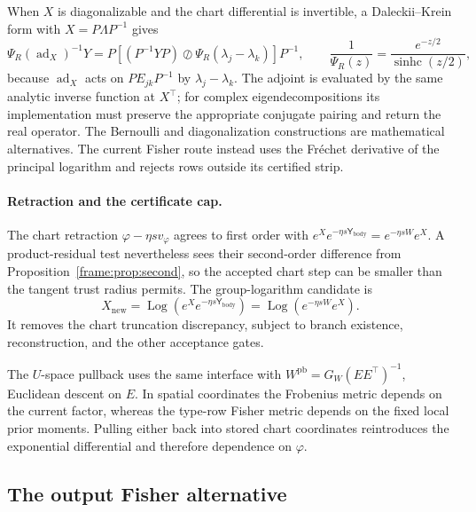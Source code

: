 \documentclass[11pt]{article}
\theoremstyle{definition}
\theoremstyle{remark}
\providecommand{\ad}{\operatorname{ad}}
\providecommand{\Log}{\operatorname{Log}}
\begin{document}
When $X$ is diagonalizable and the chart differential is invertible, a Daleckii--Krein form \cite[Ch.~3]{frame:Higham2008} with $X=P\Lambda P^{-1}$ gives
\begin{equation}\label{frame:eq:dk}
\Psi_R(\ad_X)^{-1}Y=P\left[(P^{-1}YP)\oslash\Psi_R(\lambda_j-\lambda_k)\right]P^{-1},\qquad \frac{1}{\Psi_R(z)}=\frac{e^{-z/2}}{\operatorname{sinhc}(z/2)},
\end{equation}
because \(\ad_X\) acts on \(PE_{jk}P^{-1}\) by \(\lambda_j-\lambda_k\). The adjoint is evaluated by the same analytic inverse function at \(X^\top\); for complex eigendecompositions its implementation must preserve the appropriate conjugate pairing and return the real operator. The Bernoulli and diagonalization constructions are mathematical alternatives. The current Fisher route instead uses the Fr\'echet derivative of the principal logarithm and rejects rows outside its certified strip.

\paragraph{Retraction and the certificate cap.} The chart retraction \(\varphi-\eta sv_\varphi\) agrees to first order with \(e^Xe^{-\eta s\mathsf{Y}_{\mathrm{body}}}=e^{-\eta sW}e^X\). A product-residual test nevertheless sees their second-order difference from Proposition~\ref{frame:prop:second}, so the accepted chart step can be smaller than the tangent trust radius permits. The group-logarithm candidate is
\begin{equation}\label{frame:eq:fisher-grouplog}
X_{\mathrm{new}}=\Log\left(e^Xe^{-\eta s\mathsf{Y}_{\mathrm{body}}}\right)=\Log\left(e^{-\eta sW}e^X\right).
\end{equation}
It removes the chart truncation discrepancy, subject to branch existence, reconstruction, and the other acceptance gates.

The $U$-space pullback uses the same interface with $W^{\mathrm{pb}}=G_W(EE^\top)^{-1}$, Euclidean descent on $E$. In spatial coordinates the Frobenius metric depends on the current factor, whereas the type-row Fisher metric depends on the fixed local prior moments. Pulling either back into stored chart coordinates reintroduces the exponential differential and therefore dependence on $\varphi$.

\subsection{The output Fisher alternative}\label{frame:sec:output}
\end{document}
